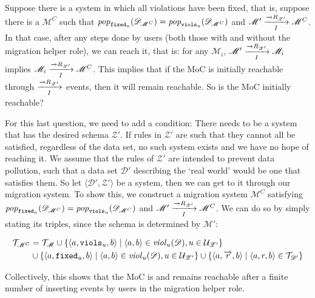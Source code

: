 \documentclass[runningheads]{llncs}
\newcommand{\id}[1]{\text{\it #1\/}}
\newcommand{\popF}[1]{\id{pop}_{#1}}
\newcommand{\pop}[2]{\popF{#1}(#2)}
\newcommand{\viol}[2]{\violC{#1}(#2)}
\newcommand{\violC}[1]{\id{viol}_{#1}}
\newcommand{\pair}[2]{\langle{#1},{#2}\rangle}
\newcommand{\triple}[3]{\langle{#1},{#2},{#3}\rangle}
\newcommand{\rels}{\mathcal{R}}   %
\newcommand{\triples}{\mathcal{T}}
\newcommand{\rules}{\mathcal{U}}
\newcommand{\dataset}{\mathscr{D}}
\newcommand{\schema}{\mathscr{Z}}
\newcommand{\migrsys}{\mathscr{M}}
\begin{document}
   Suppose there is a system in which all violations have been fixed, that is, suppose there is a $\migrsys^C$ such that $\pop{{\tt fixed}_u}{\dataset_{\migrsys^C}}=\pop{{\tt viols}_u}{\dataset_{\migrsys^C}}$ and $\migrsys'\xrightarrow[I]{\overrightarrow\rels_{\schema'}} \migrsys^C$.
   In that case, after any steps done by users (both those with and without the migration helper role), we can reach it, that is: for any $\migrsys_i$, $\migrsys'\xrightarrow[I]{\overrightarrow\rels_{\schema'}} \migrsys_i$ implies $\migrsys_i\xrightarrow[I]{\overrightarrow\rels_{\schema'}} \migrsys^C$.
   This implies that if the MoC is initially reachable through $\xrightarrow[I]{\overrightarrow\rels_{\schema'}}$ events, then it will remain reachable.
   So is the MoC initially reachable?
   
   For this last question, we need to add a condition:
   There needs to be a system that has the desired schema $\schema'$.
   If rules in $\schema'$ are such that they cannot all be satisfied, regardless of the data set, no such system exists and we have no hope of reaching it.
   We assume that the rules of $\schema'$ are intended to prevent data pollution, such that a data set $\dataset'$ describing the `real world' would be one that satisfies them.
   So let $\pair{\dataset'}{\schema'}$ be a system, then we can get to it through our migration system.
   To show this, we construct a migration system $\migrsys^C$ satisfying $\pop{{\tt fixed}_u}{\dataset_{\migrsys^C}}=\pop{{\tt viols}_u}{\dataset_{\migrsys^C}}$ and $\migrsys'\xrightarrow[I]{\overrightarrow\rels_{\schema'}} \migrsys^C$.
   We can do so by simply stating its triples, since the schema is determined by $\migrsys'$:
   
\begin{align}
   \begin{aligned}
   \triples_{\migrsys^C} &= \triples_\migrsys 
   \cup  \{\triple{a}{{\tt viols}_u}{b} \mid \pair{a}{b}\in \viol{u}{\dataset}, u\in \rules_{\schema'} \} \\
   &\cup \{\triple{a}{{\tt fixed}_u}{b} \mid \pair{a}{b}\in \viol{u}{\dataset}, u\in \rules_{\schema'} \}
   \cup \{\triple{a}{\overrightarrow{r}}{b} \mid \triple{a}{r}{b}\in\triples_{\dataset'}\}   
   \end{aligned}
\end{align}
   
   Collectively, this shows that the MoC is and remains reachable after a finite number of inserting events by users in the migration helper role.
   
\end{document}
